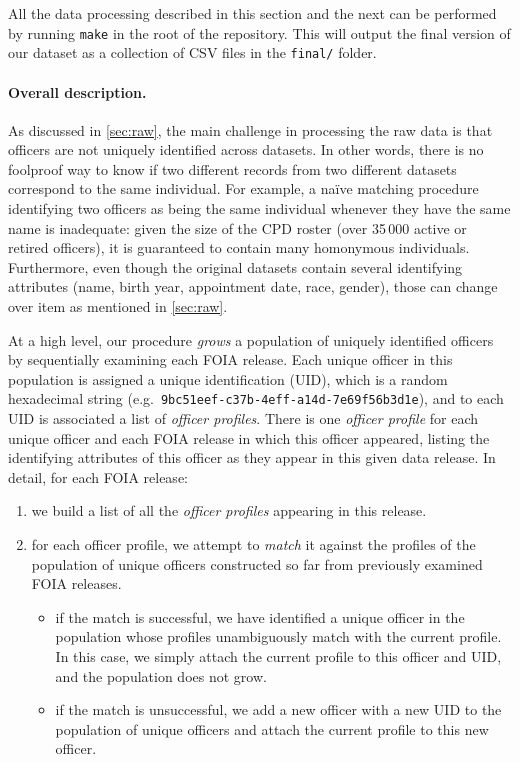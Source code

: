 All the data processing described in this section and the next can be performed
by running \texttt{make} in the root of the repository. This will output the
final version of our dataset as a collection of CSV files in the
\texttt{final/} folder.

\paragraph{Overall description.}
As discussed in \cref{sec:raw}, the main challenge in processing the raw data
is that officers are not uniquely identified across datasets. In other words,
there is no foolproof way to know if two different records from two different
datasets correspond to the same individual. For example, a na\"ive matching
procedure identifying two officers as being the same individual whenever they
have the same name is inadequate: given the size of the CPD roster (over 35\,000
active or retired officers), it is guaranteed to contain many homonymous
individuals. Furthermore, even though the original datasets contain several
identifying attributes (name, birth year, appointment date, race, gender),
 those can change over item as mentioned in \cref{sec:raw}.

At a high level, our procedure \emph{grows} a population of uniquely identified
officers by sequentially examining each FOIA release. Each unique officer in
this population is assigned a unique identification (UID), which is a random hexadecimal string (e.g.\
\texttt{9bc51eef-c37b-4eff-a14d-7e69f56b3d1e}), and to each UID is associated
a list of \emph{officer profiles}. There is one \emph{officer profile} for each
unique officer and each FOIA release in which this officer appeared, listing
the identifying attributes of this officer as they appear in this given data
release. In detail, for each FOIA release:
\begin{enumerate}
	\item we build a list of all the \emph{officer profiles} appearing in this
		release.
	\item for each officer profile, we attempt to \emph{match} it against the
		profiles of the population of unique officers constructed so far from
		previously examined FOIA releases.
		\begin{itemize}
			\item if the match is successful, we have identified a unique officer in
				the population whose profiles unambiguously match with the
				current profile. In this case, we simply attach the current
				profile to this officer and UID, and
				the population does not grow.
			\item if the match is unsuccessful, we add a new officer with a new UID to the population of unique
				officers and attach the current profile to this new officer.
		\end{itemize}
\end{enumerate}

